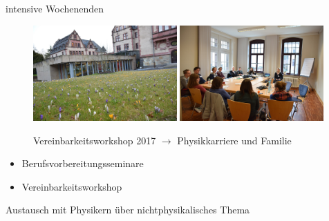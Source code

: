 \documentclass[
]{beamer}
\begin{document}
\begin{frame}{intensive Wochenenden}
  \begin{minipage}[0.6\textwidth]
    \begin{figure}
      \centering
      \includegraphics[width=0.49\textwidth]{figure/vereinbarkeitsworkshop_2017_PZ}\hfill
      \includegraphics[width=0.49\textwidth]{figure/vereinbarkeitsworkshop_2017_TN}\\
      \begin{center}
        Vereinbarkeitsworkshop 2017 $\rightarrow$ Physikkarriere und Familie
      \end{center}
     \end{figure}
  \end{minipage}
  \begin{minipage}[0.4\textwidth]
    \begin{itemize}
      \item Berufsvorbereitungsseminare
      \item Vereinbarkeitsworkshop
    \end{itemize}
    Austausch mit Physikern über nichtphysikalisches Thema
  \end{minipage}
\end{frame}
\end{document}
